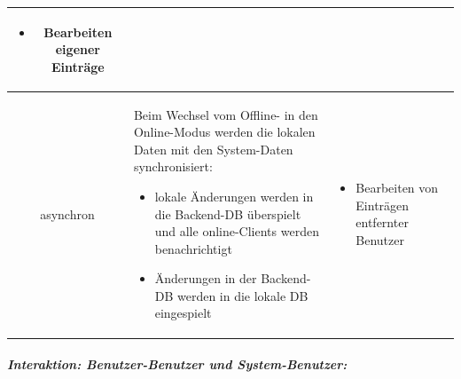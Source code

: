 \begin{table}[H]
\begin{adjustwidth}{-1.7cm}{1.7cm}
\begin{tabulary}{19cm}{|C|M|M|}
\begin{itemize}[leftmargin=*,noitemsep,topsep=0ex,parsep=1pt,partopsep=0pt]
	\item Bearbeiten eigener Einträge
\end{itemize}
				\endgroup
\\ \hline
asynchron &
				\begingroup
    				\fontsize{9pt}{10pt}\selectfont
Beim Wechsel vom Offline- in den Online-Modus werden die lokalen Daten mit den System-Daten synchronisiert:
\begin{itemize}[leftmargin=*,noitemsep,topsep=1ex,parsep=0pt,partopsep=0pt]
	\item lokale Änderungen werden in die Backend-DB überspielt und alle online-Clients werden benachrichtigt
	\item Änderungen in der Backend-DB werden in die lokale DB eingespielt
\end{itemize}
				\endgroup
		& %
				\begingroup
    				\fontsize{9pt}{10pt}\selectfont
\begin{itemize}[leftmargin=*,noitemsep,topsep=1ex,parsep=0pt,partopsep=0pt]
    \item Bearbeiten von Einträgen entfernter Benutzer
\end{itemize}
				\endgroup
		\\ \hline
		\end{tabulary}
  		\end{adjustwidth}
	\end{table}
\vspace{1ex}\noindent
\subparagraph{Interaktion: Benutzer-Benutzer und System-Benutzer:}
